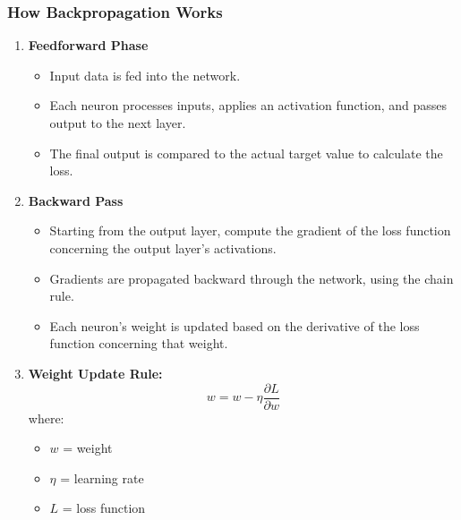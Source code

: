 \documentclass[aspectratio=169]{beamer}
\begin{document}
\begin{frame}[fragile]
    \frametitle{How Backpropagation Works}
    \begin{enumerate}
        \item \textbf{Feedforward Phase}  
            \begin{itemize}
                \item Input data is fed into the network.
                \item Each neuron processes inputs, applies an activation function, and passes output to the next layer.
                \item The final output is compared to the actual target value to calculate the loss.
            \end{itemize}
        
        \item \textbf{Backward Pass}  
            \begin{itemize}
                \item Starting from the output layer, compute the gradient of the loss function concerning the output layer's activations.
                \item Gradients are propagated backward through the network, using the chain rule.
                \item Each neuron’s weight is updated based on the derivative of the loss function concerning that weight.
            \end{itemize}
        
        \item \textbf{Weight Update Rule:}
            \begin{equation}
                w = w - \eta \frac{\partial L}{\partial w}
            \end{equation}
            where:
            \begin{itemize}
                \item \( w \) = weight
                \item \( \eta \) = learning rate
                \item \( L \) = loss function
            \end{itemize}
    \end{enumerate}
\end{frame}
\end{document}
